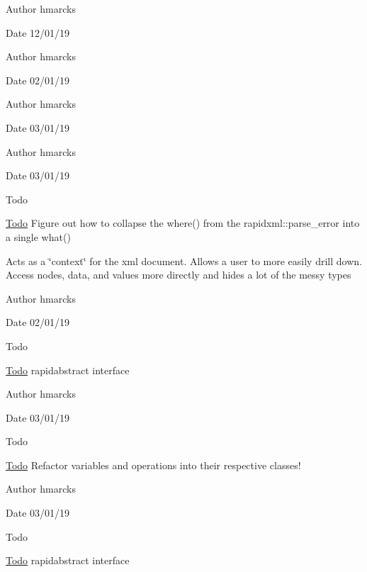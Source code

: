 \begin{DoxyAuthor}{Author}
hmarcks
\end{DoxyAuthor}
\begin{DoxyDate}{Date}
12/01/19
\end{DoxyDate}
\begin{DoxyAuthor}{Author}
hmarcks
\end{DoxyAuthor}
\begin{DoxyDate}{Date}
02/01/19
\end{DoxyDate}
\begin{DoxyAuthor}{Author}
hmarcks
\end{DoxyAuthor}
\begin{DoxyDate}{Date}
03/01/19
\end{DoxyDate}
\begin{DoxyAuthor}{Author}
hmarcks
\end{DoxyAuthor}
\begin{DoxyDate}{Date}
03/01/19
\end{DoxyDate}
\begin{DoxyRefDesc}{Todo}
\item[\mbox{\hyperlink{todo__todo000025}{Todo}}]Figure out how to collapse the where() from the rapidxml\+::parse\+\_\+error into a single what() \end{DoxyRefDesc}


Acts as a \char`\"{}context\char`\"{} for the xml document. Allows a user to more easily drill down. Access nodes, data, and values more directly and hides a lot of the messy types

\begin{DoxyAuthor}{Author}
hmarcks
\end{DoxyAuthor}
\begin{DoxyDate}{Date}
02/01/19
\end{DoxyDate}
\begin{DoxyRefDesc}{Todo}
\item[\mbox{\hyperlink{todo__todo000027}{Todo}}]rapidabstract interface \end{DoxyRefDesc}


\begin{DoxyAuthor}{Author}
hmarcks
\end{DoxyAuthor}
\begin{DoxyDate}{Date}
03/01/19
\end{DoxyDate}
\begin{DoxyRefDesc}{Todo}
\item[\mbox{\hyperlink{todo__todo000028}{Todo}}]Refactor variables and operations into their respective classes! \end{DoxyRefDesc}


\begin{DoxyAuthor}{Author}
hmarcks
\end{DoxyAuthor}
\begin{DoxyDate}{Date}
03/01/19
\end{DoxyDate}
\begin{DoxyRefDesc}{Todo}
\item[\mbox{\hyperlink{todo__todo000031}{Todo}}]rapidabstract interface \end{DoxyRefDesc}
